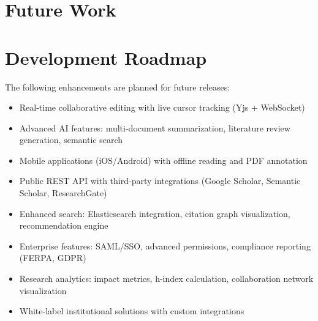 \section{Future Work}
\label{sec:future-work}

\section{Development Roadmap}
\label{sec:future-roadmap}

The following enhancements are planned for future releases:

\begin{itemize}
    \item Real-time collaborative editing with live cursor tracking (Yjs + WebSocket)
    
    \item Advanced AI features: multi-document summarization, literature review generation, semantic search
    
    \item Mobile applications (iOS/Android) with offline reading and PDF annotation
    
    \item Public REST API with third-party integrations (Google Scholar, Semantic Scholar, ResearchGate)
    
    \item Enhanced search: Elasticsearch integration, citation graph visualization, recommendation engine
    
    \item Enterprise features: SAML/SSO, advanced permissions, compliance reporting (FERPA, GDPR)
    
    \item Research analytics: impact metrics, h-index calculation, collaboration network visualization
    
    \item White-label institutional solutions with custom integrations
\end{itemize}
